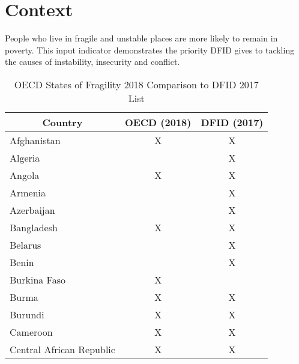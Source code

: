 \section{Context}
People who live in fragile and unstable places are more likely to remain in poverty. %
This input indicator demonstrates the priority DFID gives to tackling the causes of instability, insecurity and conflict. %

\begin{table}[htbp]
	\centering
	\caption{OECD States of Fragility 2018 Comparison to DFID 2017 List}\label{tab:fcas_fragstates} 
		\scriptsize
	\begin{tabular}{lcc}
		\toprule
		\multicolumn{1}{c}{\textbf{Country}}         & \textbf{OECD} (2018)               & \textbf{DFID} (2017)               \\ \hline
		\rule{0pt}{7pt}Afghanistan                             & \cellcolor[HTML]{E2EFD9}X & \cellcolor[HTML]{E2EFD9}X \\
		Algeria                                 &                           & \cellcolor[HTML]{FBE4D5}X \\
		Angola                                  & \cellcolor[HTML]{E2EFD9}X & \cellcolor[HTML]{E2EFD9}X \\
		Armenia                                 &                           & \cellcolor[HTML]{FBE4D5}X \\
		Azerbaijan                              &                           & \cellcolor[HTML]{FBE4D5}X \\
		Bangladesh                              & \cellcolor[HTML]{E2EFD9}X & \cellcolor[HTML]{E2EFD9}X \\
		Belarus                                 &                           & \cellcolor[HTML]{FBE4D5}X \\
		Benin                                   &                           & \cellcolor[HTML]{FBE4D5}X \\
		Burkina   Faso                          & \cellcolor[HTML]{FFF2CC}X &                           \\
		Burma                                   & \cellcolor[HTML]{E2EFD9}X & \cellcolor[HTML]{E2EFD9}X \\
		Burundi                                 & \cellcolor[HTML]{E2EFD9}X & \cellcolor[HTML]{E2EFD9}X \\
		Cameroon                                & \cellcolor[HTML]{E2EFD9}X & \cellcolor[HTML]{E2EFD9}X \\
		Central   African Republic              & \cellcolor[HTML]{E2EFD9}X & \cellcolor[HTML]{E2EFD9}X \\

\end{tabular}
\end{table}
